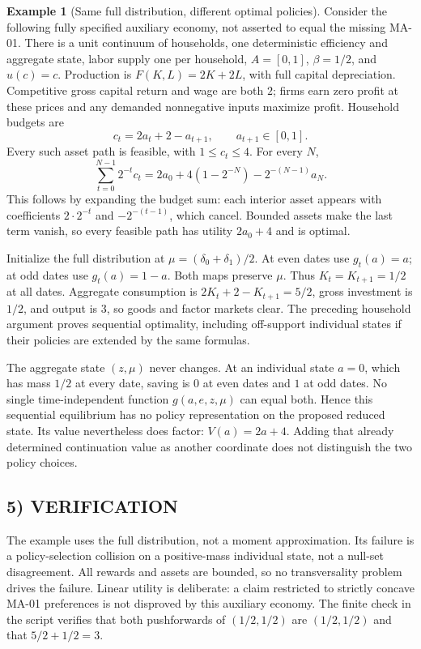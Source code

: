 \documentclass[11pt,a4paper]{article}
\theoremstyle{definition}
\newtheorem{example}[theorem]{Example}
\begin{document}
\begin{example}[Same full distribution, different optimal policies]
Consider the following fully specified auxiliary economy, not asserted to equal the missing MA-01. There is a unit continuum of households, one deterministic efficiency and aggregate state, labor supply one per household, $A=[0,1]$, $\beta=1/2$, and $u(c)=c$. Production is
$F(K,L)=2K+2L$, with full capital depreciation. Competitive gross capital return and wage are both $2$; firms earn zero profit at these prices and any demanded nonnegative inputs maximize profit. Household budgets are
\[
 c_t=2a_t+2-a_{t+1},\qquad a_{t+1}\in[0,1].
\]
Every such asset path is feasible, with $1\le c_t\le4$. For every $N$,
\[
 \sum_{t=0}^{N-1}2^{-t}c_t
 =2a_0+4(1-2^{-N})-2^{-(N-1)}a_N.
\]
This follows by expanding the budget sum: each interior asset appears with coefficients $2\cdot2^{-t}$ and $-2^{-(t-1)}$, which cancel. Bounded assets make the last term vanish, so every feasible path has utility $2a_0+4$ and is optimal.

Initialize the full distribution at $\mu=(\delta_0+\delta_1)/2$. At even dates use $g_t(a)=a$; at odd dates use $g_t(a)=1-a$. Both maps preserve $\mu$. Thus $K_t=K_{t+1}=1/2$ at all dates. Aggregate consumption is
$2K_t+2-K_{t+1}=5/2$, gross investment is $1/2$, and output is $3$, so goods and factor markets clear. The preceding household argument proves sequential optimality, including off-support individual states if their policies are extended by the same formulas.

The aggregate state $(z,\mu)$ never changes. At an individual state $a=0$, which has mass $1/2$ at every date, saving is $0$ at even dates and $1$ at odd dates. No single time-independent function $g(a,e,z,\mu)$ can equal both. Hence this sequential equilibrium has no policy representation on the proposed reduced state. Its value nevertheless does factor: $V(a)=2a+4$. Adding that already determined continuation value as another coordinate does not distinguish the two policy choices.
\end{example}

\subsection*{5) VERIFICATION}
The example uses the full distribution, not a moment approximation. Its failure is a policy-selection collision on a positive-mass individual state, not a null-set disagreement. All rewards and assets are bounded, so no transversality problem drives the failure. Linear utility is deliberate: a claim restricted to strictly concave MA-01 preferences is not disproved by this auxiliary economy. The finite check in the script verifies that both pushforwards of $(1/2,1/2)$ are $(1/2,1/2)$ and that $5/2+1/2=3$.
\end{document}
